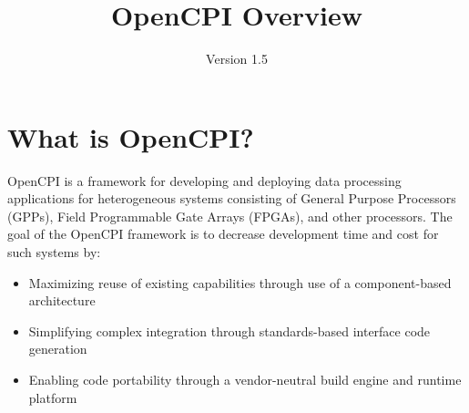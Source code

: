 \def\docTitle{OpenCPI Overview}
\def\docVersion{1.5}
\def\snippetpath{snippets}


\setlength{\parindent}{0pt} %
\newcommand{\forceindent}{\leavevmode{\parindent=1em\indent}}
\date{Version \docVersion} %
\title{\docTitle}
\lhead{\small {\docTitle} }
\def\bstart{~\\
\begin{minipage}{\linewidth}}
\def\bend{\end{minipage}
~\\
}

\section*{What is OpenCPI?}
\label{sec:what_is_opencpi}
OpenCPI is a framework for developing and deploying data processing applications for heterogeneous systems consisting of General Purpose Processors (GPPs), Field Programmable Gate Arrays (FPGAs), and other processors. The goal of the OpenCPI framework is to decrease development time and cost for such systems by:
\begin{itemize}
\item Maximizing reuse of existing capabilities through use of a component-based architecture
\item Simplifying complex integration through standards-based interface code generation
\item Enabling code portability through a vendor-neutral build engine and runtime platform
\end{itemize}

